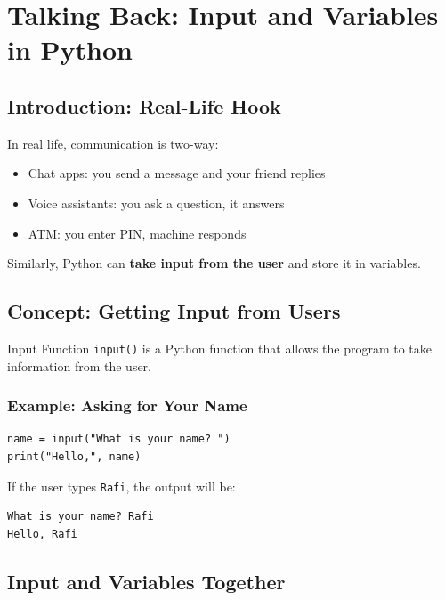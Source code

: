 \chapter{Talking Back: Input and Variables in Python}

\section{Introduction: Real-Life Hook}

In real life, communication is two-way:

\begin{itemize}
    \item Chat apps: you send a message and your friend replies  
    \item Voice assistants: you ask a question, it answers  
    \item ATM: you enter PIN, machine responds  
\end{itemize}

Similarly, Python can \textbf{take input from the user} and store it in variables.

\section{Concept: Getting Input from Users}

\begin{definition}{Input Function}
\texttt{input()} is a Python function that allows the program to take information from the user.
\end{definition}

\subsection{Example: Asking for Your Name}

\begin{verbatim}
name = input("What is your name? ")
print("Hello,", name)
\end{verbatim}

If the user types \texttt{Rafi}, the output will be:

\begin{verbatim}
What is your name? Rafi
Hello, Rafi
\end{verbatim}

\section{Input and Variables Together}

